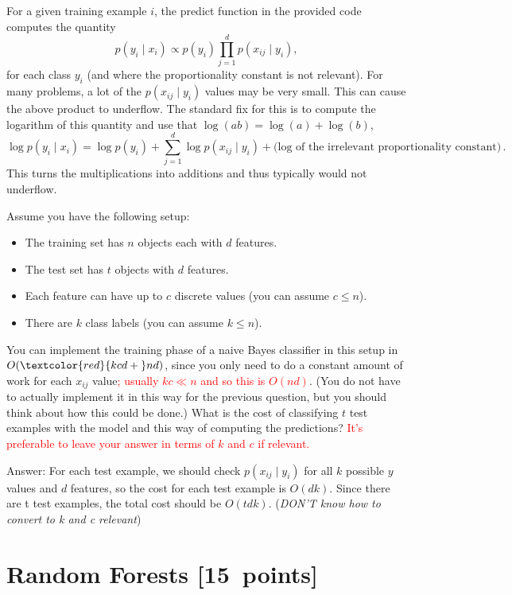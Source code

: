 \documentclass{article}
\newcommand{\blu}[1]{{\textcolor{blu}{#1}}}
\newcommand{\gre}[1]{\textcolor{gre}{#1}}
\newcommand{\red}[1]{\textcolor{red}{#1}}
\newcommand\ans[1]{\par\gre{Answer: #1}}
\let\ask\blu
\let\update\red
\newcommand\pts[1]{\textcolor{pointscolour}{[#1~points]}}
\begin{document}
    For a given training example $i$, the predict function in the provided code computes the quantity
    \[
    p(y_i \mid x_i) \propto p(y_i)\prod_{j=1}^d p(x_{ij} \mid y_i),
    \]
    for each class $y_i$ (and where the proportionality constant is not relevant). For many problems, a lot of the $p(x_{ij} \mid y_i)$ values may be very small. This can cause the above product to underflow. The standard fix for this is to compute the logarithm of this quantity and use that $\log(ab) = \log(a)+\log(b)$,
    \[
    \log p(y_i \mid x_i) = \log p(y_i) + \sum_{j=1}^d \log p(x_{ij} \mid y_i) + \text{(log of the irrelevant proportionality constant)} \, .
    \]
    This turns the multiplications into additions and thus typically would not underflow.

    Assume you have the following setup:
    \begin{itemize}
        \item The training set has $n$ objects each with $d$ features.
        \item The test set has $t$ objects with $d$ features.
        \item Each feature can have up to $c$ discrete values (you can assume $c \leq n$).
        \item There are $k$ class labels (you can assume $k \leq n$).
    \end{itemize}
    You can implement the training phase of a naive Bayes classifier in this setup in $O(\update{k c d + {}} nd)$, since you only need to do a constant amount of work for each $x_{ij}$ value\update{; usually $k c \ll n$ and so this is $O(n d)$}. (You do not have to actually implement it in this way for the previous question, but you should think about how this could be done.)
    \ask{What is the cost of classifying $t$ test examples with the model and this way of computing the predictions?}
    \update{It's preferable to leave your answer in terms of $k$ and $c$ if relevant.}
    \ans{For each test example, we should check $p(x_{ij} \mid y_i)$ for all $k$ possible $y$ values and $d$ features, so the cost for each test example is $O(dk)$. Since there are t test examples, the total cost should be $O(tdk)$. (\emph{DON'T know how to convert to k and c relevant})}


    \clearpage
    \section{Random Forests \pts{15}}
\end{document}
